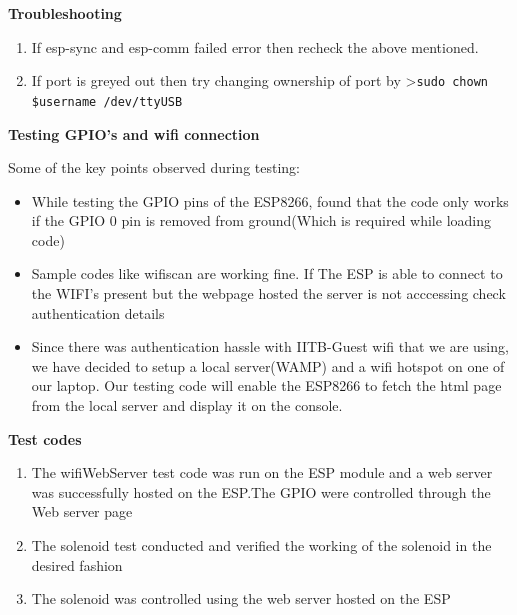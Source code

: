 \documentclass[16pt]{article}
\begin{document}
\vspace{0.5cm}
{\Large{\textbf{Troubleshooting}}}

\begin{enumerate}

\item
  If esp-sync and esp-comm failed error then recheck the above
  mentioned.
\item
  If port is greyed out then try changing ownership of port by
  \textgreater{}\texttt{sudo chown \$username /dev/ttyUSB}
\end{enumerate}

\vspace{0.5cm}
\textbf{Testing GPIO's and wifi connection}

Some of the key points observed during testing:

\begin{itemize}

\item
  While testing the GPIO pins of the ESP8266, found that the code only
  works if the GPIO 0 pin is removed from ground(Which is required while
  loading code)
\item
  Sample codes like wifiscan are working fine. If The ESP is able to
  connect to the WIFI's present but the webpage hosted the server is not
  acccessing check authentication details
\item
  Since there was authentication hassle with IITB-Guest wifi that we are
  using, we have decided to setup a local server(WAMP) and a wifi
  hotspot on one of our laptop. Our testing code will enable the ESP8266
  to fetch the html page from the local server and display it on the
  console.
  
\end{itemize}

\vspace{0.5cm}

\textbf{Test codes}

\begin{enumerate}

\item
  The wifiWebServer test code was run on the ESP module and a web server
  was successfully hosted on the ESP.The GPIO were controlled through
  the Web server page
\item
  The solenoid test conducted and verified the working of the solenoid
  in the desired fashion
\item
  The solenoid was controlled using the web server hosted on the ESP
\end{enumerate}
\end{document}

